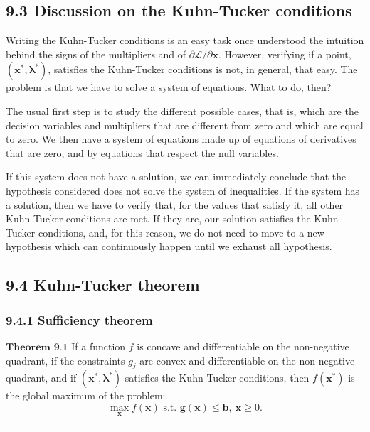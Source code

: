 \documentclass[0pt, a4paper]{article}
\newcommand{\Lagr}{\mathcal{L}}
\begin{document}
\subsection*{9.3 Discussion on the Kuhn-Tucker conditions}

Writing the Kuhn-Tucker conditions is an easy task once understood the intuition behind the signs of the multipliers and of $\partial\Lagr/\partial\textbf{x}$. However, verifying if a point, $(\textbf{x}^*, \boldsymbol{\lambda}^*)$, satisfies the Kuhn-Tucker conditions is not, in general, that easy. The problem is that we have to solve a system of equations. What to do, then?

The usual first step is to study the different possible cases, that is, which are the decision variables and multipliers that are different from zero and which are equal to zero. We then have a system of equations made up of equations of derivatives that are zero, and by equations that respect the null variables.

If this system does not have a solution, we can immediately conclude that the hypothesis considered does not solve the system of inequalities. If the system has a solution, then we have to verify that, for the values that satisfy it, all other Kuhn-Tucker conditions are met. If they are, our solution satisfies the Kuhn-Tucker conditions, and, for this reason, we do not need to move to a new hypothesis which can continuously happen until we exhaust all hypothesis. 

\subsection*{9.4 Kuhn-Tucker theorem}

\subsubsection*{9.4.1 Sufficiency theorem}


$\textbf{Theorem 9.1}$ If a function $f$ is concave and differentiable on the non-negative quadrant, if the constraints $g_j$ are convex and differentiable on the non-negative quadrant, and if $(\textbf{x}^*,\boldsymbol{\lambda}^*)$ satisfies the Kuhn-Tucker conditions, then $f(\textbf{x}^*)$ is the global maximum of the problem:
$$\max_\textbf{x}f(\textbf{x})\text{ s.t. }\textbf{g}(\textbf{x})\leq\textbf{b},\ \textbf{x}\geq0.$$
\noindent\rule{\textwidth}{1pt}
\end{document}
